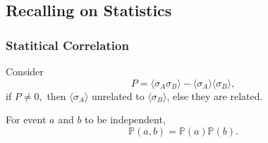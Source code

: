 \documentclass[a4paper]{article}
\begin{document}
\subsection{Recalling on Statistics}
\subsubsection{Statitical Correlation}
Consider 
\[
    P = \langle \sigma_A \sigma_B \rangle - \langle \sigma_A \rangle \langle \sigma_B \rangle,
\]
if $P \neq 0,$ then $\langle \sigma_A \rangle$ unrelated to $\langle \sigma_B \rangle$, else they are related.\\

\par For event $a$ and $b$ to be independent,
\[
    \mathbb{P}(a,b) = \mathbb{P}(a) \mathbb{P}(b).
\]  




















\end{document}
